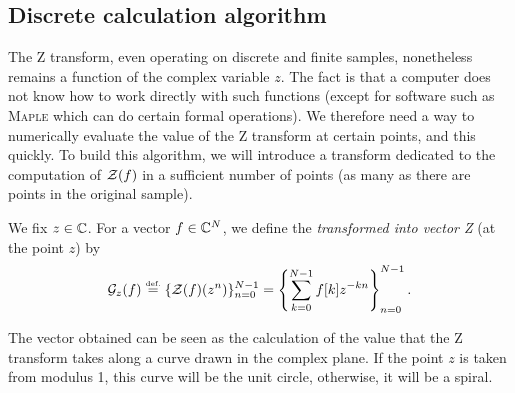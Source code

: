 \subsection{Discrete calculation algorithm}
\label{sect2-algo-trans-z} 
 
 
  The Z transform, even operating on discrete and finite samples, nonetheless remains a function of the complex variable $ z $. The fact is that a computer does not know how to work directly with such functions (except for software such as \textsc{Maple} which can do certain formal operations). We therefore need a way to numerically evaluate the value of the Z transform at certain points, and this quickly. To build this algorithm, we will introduce a transform dedicated to the computation of $ \mathcal{Z} (f) $ in a sufficient number of points (as many as there are points in the original sample).
 
\begin{defn}
\label{notation-63}  We fix $ z \in \mathbb{C} $. For a vector $ f \in \mathbb{C}^N $, we define the \textit{transformed into vector Z} (at the point $ z $) by
\begin{equation}
\label{eq-defn-z-transform-vector}
\mathcal{G}_z (f) \stackrel{\mbox{\upshape\tiny def.}}{=} \{\mathcal{Z} (f) (z^n) \}_{n = 0}^{N-1} = \left\{\sum_{k = 0}^{N-1 }{f [k] z^{- kn}} \right\}_{n = 0}^{N-1}.
\end{equation}
\end{defn}
 
 
\begin{rem}
The vector obtained can be seen as the calculation of the value that the Z transform takes along a curve drawn in the complex plane. If the point $ z $ is taken from modulus 1, this curve will be the unit circle, otherwise, it will be a spiral.
\end{rem}
 
 
 
